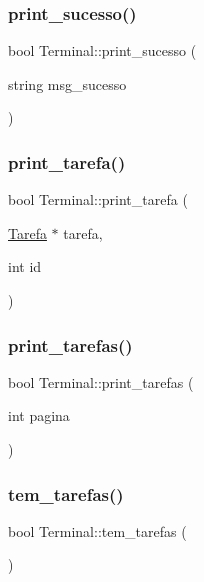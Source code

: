 \subsubsection{\texorpdfstring{print\+\_\+sucesso()}{print\_sucesso()}}
{\footnotesize\ttfamily bool Terminal\+::print\+\_\+sucesso (\begin{DoxyParamCaption}\item[{string}]{msg\+\_\+sucesso }\end{DoxyParamCaption})}

\mbox{\label{classTerminal_a3633af9ee180a1a129f9c33c1a3aa3b9}} 
\subsubsection{\texorpdfstring{print\+\_\+tarefa()}{print\_tarefa()}}
{\footnotesize\ttfamily bool Terminal\+::print\+\_\+tarefa (\begin{DoxyParamCaption}\item[{\hyperlink{classTarefa}{Tarefa} $\ast$}]{tarefa,  }\item[{int}]{id }\end{DoxyParamCaption})}

\mbox{\label{classTerminal_a99b5e852d3339543af8d740422c0f58b}} 
\subsubsection{\texorpdfstring{print\+\_\+tarefas()}{print\_tarefas()}}
{\footnotesize\ttfamily bool Terminal\+::print\+\_\+tarefas (\begin{DoxyParamCaption}\item[{int}]{pagina }\end{DoxyParamCaption})}

\mbox{\label{classTerminal_af5853d7279661f75d23fb44ade174da2}} 
\subsubsection{\texorpdfstring{tem\+\_\+tarefas()}{tem\_tarefas()}}
{\footnotesize\ttfamily bool Terminal\+::tem\+\_\+tarefas (\begin{DoxyParamCaption}{ }\end{DoxyParamCaption})}



